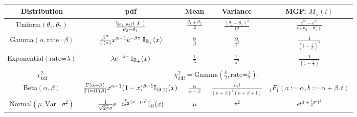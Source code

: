 \documentclass[12pt]{article}
\begin{document}
\begin{center}
\begin{tabular}{ |c|| c| c| c| c|}
\hline
 Distribution  & pdf  & Mean  & Variance  & MGF: $M_{_{X}}(t)$ \\ 
 \hline\hline
 Uniform$(\theta_1, \theta_2)$ & $  \frac{\IndicatorA{\HLTEQ[white]{x}}{[\theta_1, \theta_2]}}{\theta_2-\theta_1}$ & $ \frac{\theta_1+\theta_2}{2}$ & $\frac{(\theta_2-\theta_1)^2}{12}$ & $ \frac{e^{^{t\theta_2 }}-e^{^{t\theta_1 }}}{t(\theta_2-\theta_1)}$ \\ 
 \hline
  Gamma$(\alpha, \text{rate=}\beta)$ & $  \frac{ \beta^\alpha}{\Gamma\left( \alpha\right)}x^{\alpha-1} e^{-\beta x} \; \IndicatorA{x}{\R_{+}}$ & $\frac{\alpha}{\beta}$ & $\frac{\alpha}{\beta^2}$ & $  \frac{1}{(1-\frac{t}{\beta})^{\alpha}}$ \\ 
 \hline
  Exponential$(\text{rate=}\lambda)$ & $  \lambda e^{-\lambda x}\; \IndicatorA{x}{\R_{+}} $ & $\frac{1}{\lambda}$ & $\frac{1}{\lambda^2}$ & $  \frac{1}{(1-\frac{t}{\lambda})}$ \\ 
  \hline
$\chi^2_{k \text{df}}$ &  \multicolumn{4}{|c|}{$\chi^2_{k \text{df}} = \text{Gamma}(\frac{k}{2}, \text{rate=}\frac{1}{2}).$}\\
 \hline
   Beta$(\alpha, \beta)$ & $ \frac{\Gamma(\alpha+\beta)}{\Gamma(\alpha)\Gamma(\beta)} x^{\alpha-1} (1-x)^{\beta-1} \IndicatorA{x}{(0,1)}$ & $ \frac{\alpha}{\alpha+\beta}  $ & $ \frac{\alpha \beta}{(\alpha+\beta)^2 (\alpha+\beta+1)}  $ & $  _1F_1 (a:=\alpha, b:=\alpha+\beta, t ) $ \\ 
 \hline
  Normal$(\mu,  \text{Var=}\sigma^2)$ & $  \frac{1}{\sqrt{2\pi}\sigma}e^{-\frac{1}{2\sigma^2}(x-\mu)^2}\IndicatorA{x}{\R}$ & $ \mu $ & $ \sigma^2 $ & $ e^{\mu t +\frac{1}{2}\sigma^2 t^2 } $ \\ 
 \hline
\end{tabular}


\\





\end{center}
\end{document}
